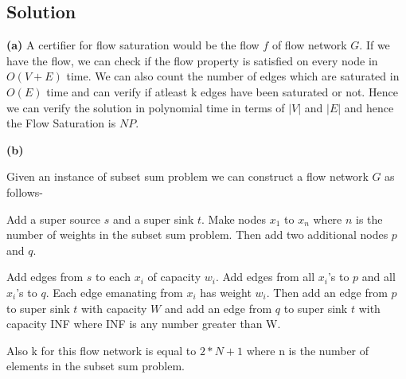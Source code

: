 \documentclass[11pt]{article}
\begin{document}
\subsection{Solution}
\textbf{(a)} A certifier for flow saturation would be the flow $f$ of flow network $G$. If we have the flow, we can check if the flow property is satisfied on every node in $O( V + E)$ time. We can also count the number of edges which are saturated in $O(E)$ time and can verify if atleast k edges have been saturated or not. Hence we can verify the solution in polynomial time in terms of $|V|$ and $|E|$ and hence the Flow Saturation is $NP$.

\textbf{(b)}

Given an instance  of subset sum problem we can construct a flow network $G$ as follows- 

Add a super source $s$ and a super sink $t$. Make nodes $x_1$ to $x_n$ where $n$ is the number of weights in the subset sum problem. Then add two additional nodes $p$ and $q$.

Add edges from $s$ to each $x_i$ of capacity $w_i$. Add edges from all $x_i$'s to $p$ and all $x_i$'s to $q$. Each edge emanating from $x_i$ has weight $w_i$. Then add an edge from $p$ to super sink $t$ with capacity $W$ and add an edge from $q$ to super sink $t$ with capacity INF where INF is any number greater than W.

Also k for this flow network is equal to $2*N + 1$ where n is the number of elements in the subset sum problem.
\end{document}
